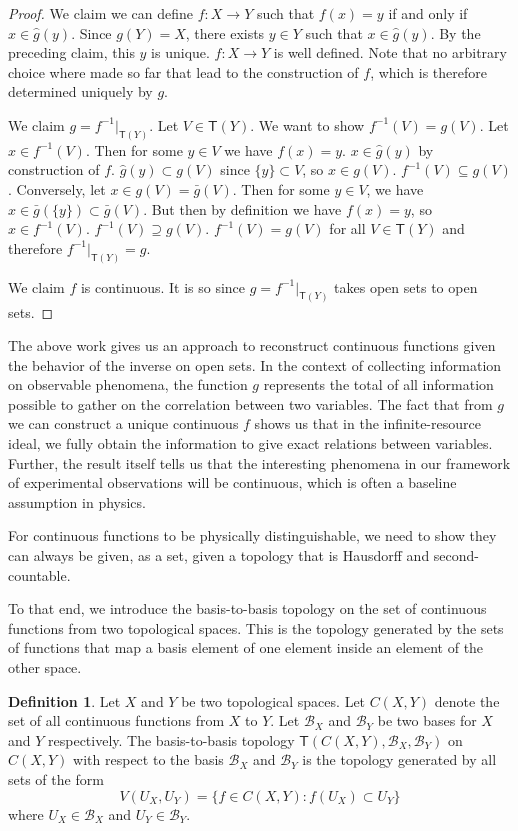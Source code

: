 \documentclass[review]{elsarticle}
\theoremstyle{plain}%
\theoremstyle{definition}
\newtheorem{defn}{Definition}[section]
\theoremstyle{remark}
\begin{document}
\begin{proof}
	We claim we can define $f: X\to Y$ such that $f(x) = y$ if and only if $x\in \hat{g}(y)$. Since $g(Y)=X$, there exists $y\in Y$ such that $x\in\hat{g}(y)$. By the preceding claim, this $y$ is unique. $f: X\to Y$ is well defined. Note that no arbitrary choice where made so far that lead to the construction of $f$, which is therefore determined uniquely by $g$. 
	
	We claim $g = f^{-1} |_{\mathsf{T}(Y)}$. Let $V\in\mathsf{T}(Y)$. We want to show $f^{-1}(V) = g(V)$. Let $x\in f^{-1}(V)$. Then for some $y \in V$ we have $f(x)=y$. $x\in \hat{g}(y)$ by construction of $f$. $\hat{g}(y) \subset g(V)$ since $\{y\}\subset V$, so $x\in g(V)$. $f^{-1}(V) \subseteq g(V)$. Conversely, let $x\in g(V)=\bar{g}(V)$. Then for some $y\in V$, we have $x\in\bar{g}(\{y\})\subset\bar{g}(V)$. But then by definition we have $f(x)=y$, so $x\in f^{-1}(V)$. $f^{-1}(V) \supseteq g(V)$. $f^{-1}(V) = g(V)$ for all $V\in\mathsf{T}(Y)$ and therefore $f^{-1}|_{\mathsf{T}(Y)}=g$.
	
	We claim $f$ is continuous. It is so since $g = f^{-1} |_{\mathsf{T}(Y)}$ takes open sets to open sets. 
\end{proof}

The above work gives us an approach to reconstruct continuous functions given the behavior of the inverse on open sets. In the context of collecting information on observable phenomena, the function $g$ represents the total of all information possible to gather on the correlation between two variables. The fact that from $g$ we can construct a unique continuous $f$ shows us that in the infinite-resource ideal, we fully obtain the information to give exact relations between variables. Further, the result itself tells us that the interesting phenomena in our framework of experimental observations will be continuous, which is often a baseline assumption in physics. 


For continuous functions to be physically distinguishable, we need to show they can always be given, as a set, given a topology that is Hausdorff and second-countable.

To that end, we introduce the basis-to-basis topology on the set of continuous functions from two topological spaces. This is the topology generated by the sets of functions that map a basis element of one element inside an element of the other space. 

\begin{defn} Let $X$ and $Y$ be two topological spaces. Let $C(X,Y)$ denote the set of all continuous functions from $X$ to $Y$. Let $\mathcal{B}_X$ and $\mathcal{B}_Y$ be two bases for $X$ and $Y$ respectively. The basis-to-basis topology $\mathsf{T}(C(X,Y), \mathcal{B}_X, \mathcal{B}_Y)$ on $C(X,Y)$ with respect to the basis $\mathcal{B}_X$ and $\mathcal{B}_Y$ is the topology generated by all sets of the form 
	$$
	V(U_X, U_Y) = \{f\in C(X,Y) : f(U_X)\subset U_Y\}
	$$
where $U_X \in \mathcal{B}_X$ and $U_Y \in \mathcal{B}_Y$.
\end{defn}
\end{document}
